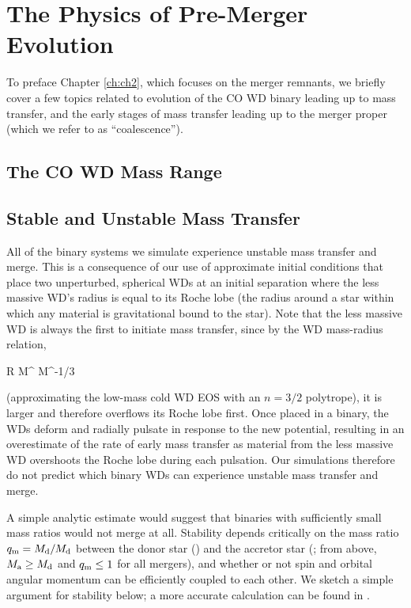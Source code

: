 \section{The Physics of Pre-Merger Evolution}

To preface Chapter \ref{ch:ch2}, which focuses on the merger remnants, we briefly cover a few topics related to evolution of the CO WD binary leading up to mass transfer, and the early stages of mass transfer leading up to the merger proper (which we refer to as ``coalescence'').

\subsection{The CO WD Mass Range}

\subsection{Stable and Unstable Mass Transfer}
\label{ssec:stable_mass_transfer}


All of the binary systems we simulate experience unstable mass transfer and merge.  This is a consequence of our use of approximate initial conditions that place two unperturbed, spherical WDs at an initial separation where the less massive WD's radius is equal to its Roche lobe (the radius around a star within which any material is gravitational bound to the star).  Note that the less massive WD is always the first to initiate mass transfer, since by the WD mass-radius relation,

\eqbegin
R \propto M^{} \approx M^{-1/3}
\label{eq:c1_massradiusrelation}
\eqend

\noindent (approximating the low-mass cold WD EOS with an $n = 3/2$ polytrope), it is larger and therefore overflows its Roche lobe first.  Once placed in a binary, the WDs deform and radially pulsate in response to the new potential, resulting in an overestimate of the rate of early mass transfer as material from the less massive WD overshoots the Roche lobe during each pulsation.  Our simulations therefore do not predict which binary WDs can experience unstable mass transfer and merge.

A simple analytic estimate would suggest that binaries with sufficiently small mass ratios would not merge at all.  Stability depends critically on the mass ratio $\qm = \Md/\Md$ between the donor star (\Md) and the accretor star (\Ma; from above, $\Ma \geq \Md$ and $\qm \leq 1$ for all mergers), and whether or not spin and orbital angular momentum can be efficiently coupled to each other.  We sketch a simple argument for stability below; a more accurate calculation can be found in \citep{marsns04}.

